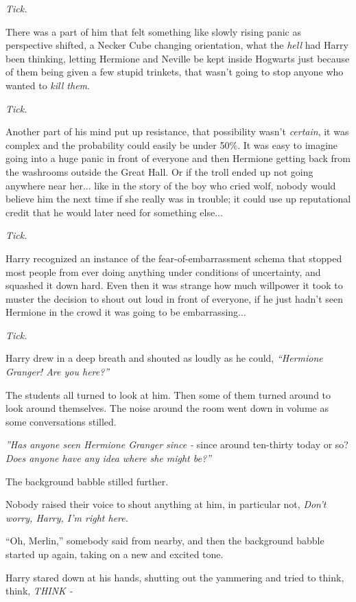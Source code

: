 \emph{Tick.}

There was a part of him that felt something like slowly rising panic as
perspective shifted, a Necker Cube changing orientation, what the
\emph{hell} had Harry been thinking, letting Hermione and Neville be
kept inside Hogwarts just because of them being given a few stupid
trinkets, that wasn't going to stop anyone who wanted to \emph{kill
them}.

\emph{Tick.}

Another part of his mind put up resistance, that possibility wasn't
\emph{certain}, it was complex and the probability could easily be under
50\%. It was easy to imagine going into a huge panic in front of
everyone and then Hermione getting back from the washrooms outside the
Great Hall. Or if the troll ended up not going anywhere near her...
like in the story of the boy who cried wolf, nobody would believe him
the next time if she really was in trouble; it could use up reputational
credit that he would later need for something else...

\emph{Tick.}

Harry recognized an instance of the fear-of-embarrassment schema that
stopped most people from ever doing anything under conditions of
uncertainty, and squashed it down hard. Even then it was strange how
much willpower it took to muster the decision to shout out loud in front
of everyone, if he just hadn't seen Hermione in the crowd it was going
to be embarrassing...

\emph{Tick.}

Harry drew in a deep breath and shouted as loudly as he could,
\emph{``Hermione Granger! Are you here?''}

The students all turned to look at him. Then some of them turned around
to look around themselves. The noise around the room went down in volume
as some conversations stilled.

\emph{''Has anyone seen Hermione Granger since -} since around ten-thirty
today or so? \emph{Does anyone have any idea where she might be?''}

The background babble stilled further.

Nobody raised their voice to shout anything at him, in particular not,
\emph{Don't worry, Harry, I'm right here.}

``Oh, Merlin,'' somebody said from nearby, and then the background
babble started up again, taking on a new and excited tone.

Harry stared down at his hands, shutting out the yammering and tried to
think, think, \emph{THINK -}

